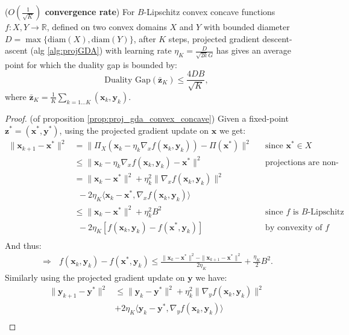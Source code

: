 \begin{proposition}
    \label{prop:proj_gda_convex_concave}
    (\textbf{$O(\frac{1}{\sqrt{K}})$ convergence rate}) For $B$-Lipschitz convex concave functions $f:X,Y \rightarrow \mathbb{R}$, defined on two convex domains $X$ and $Y$ with bounded diameter $D=\max \lbrace  \text{diam}(X), \text{diam}(Y) \rbrace$, after $K$ steps, projected gradient descent-ascent (alg \ref{alg:projGDA}) with learning rate $\eta_K = \frac{D}{\sqrt{2k}G}$ has gives an average point for which the duality gap is bounded by:
    \[
        \text{Duality Gap}(\bar{\bm{z}}_K) \leq \frac{4 D B}{\sqrt{K}},
    \]
    where $\bar{\bm{z}}_K = \frac{1}{K} \sum_{k = 1...K} (\bm{x}_k,\bm{y}_k)$.
\end{proposition}
\begin{proof}
    (of proposition \ref{prop:proj_gda_convex_concave}) Given a fixed-point $\bm{z}^*=(\bm{x}^*,\bm{y}^*)$, using the projected gradient update on $\bm{x}$ we get:
    \begin{align*}
        \| \bm{x}_{k+1}-\bm{x}^* \|^2 &= \| \Pi_X(\bm{x}_{k}-\eta_k \nabla_x f(\bm{x}_k,\bm{y}_k) ) - \Pi(\bm{x}^*) \|^2 && \text{since $\bm{x}^*\in X$} \\
        &\leq \| \bm{x}_{k}-\eta_k \nabla_x f(\bm{x}_k,\bm{y}_k) - \bm{x}^* \|^2 && \text{projections are non-expansive} \\
        & = \| \bm{x}_k - \bm{x}^* \|^2 + \eta_k^2 \| \nabla_x f(\bm{x}_k,\bm{y}_k)\|^2  \\ & ~ ~ - 2 \eta_K \langle  \bm{x}_k - \bm{x}^*,  \nabla_x f(\bm{x}_k,\bm{y}_k) \rangle \\
        & \leq \| \bm{x}_k - \bm{x}^* \|^2 + \eta_k^2 B^2 && \text{since $f$ is $B$-Lipschitz} \\ & ~ ~ - 2  \eta_K [f(\bm{x}_k,\bm{y}_k)-f(\bm{x}^*,\bm{y}_k)] && \text{by convexity of $f$}\\
    \end{align*}
    And thus:
    \begin{align*}
        \Rightarrow ~~~ f(\bm{x}_k,\bm{y}_k)-f(\bm{x}^*,\bm{y}_k) \leq \frac{  \| \bm{x}_k - \bm{x}^* \|^2 - \| \bm{x}_{k+1}-\bm{x}^* \|^2
        }{2 \eta_K
        } + \frac{\eta_K}{2} B^2. \tag{a}
    \end{align*}
    Similarly using the projected gradient update on $\bm{y}$ we have:
    \begin{align*}
        \| \bm{y}_{k+1}-\bm{y}^* \|^2 &\leq \| \bm{y}_k - \bm{y}^* \|^2 + \eta_k^2 \| \nabla_y f(\bm{x}_k,\bm{y}_k)\|^2 \\ &  + 2 \eta_K \langle  \bm{y}_k - \bm{y}^*,  \nabla_y f(\bm{x}_k,\bm{y}_k) \rangle \\

\end{align*}
\end{proof}
